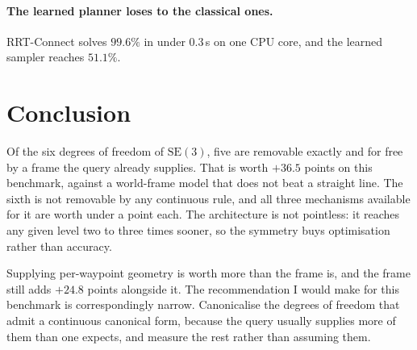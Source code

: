 \documentclass[11pt,a4paper]{article}
\newcommand{\SE}{\mathrm{SE}(3)}
\begin{document}
\paragraph{The learned planner loses to the classical ones.} RRT-Connect solves
$99.6\%$ in under $0.3$\,s on one CPU core, and the learned sampler reaches
$51.1\%$. 
\section{Conclusion}

Of the six degrees of freedom of $\SE$, five are removable exactly and for free
by a frame the query already supplies. That is worth $+36.5$ points on this
benchmark, against a world-frame model that does not beat a straight line. The
sixth is not removable by any continuous rule, and all three mechanisms available
for it are worth under a point each. The architecture is not pointless: it
reaches any given level two to three times sooner, so the symmetry buys
optimisation rather than accuracy.

Supplying per-waypoint geometry is worth more than the frame is, and the frame
still adds $+24.8$ points alongside it. The recommendation I would make for this
benchmark is correspondingly narrow. Canonicalise the degrees of freedom that
admit a continuous canonical form, because the query usually supplies more of
them than one expects, and measure the rest rather than assuming them.
\end{document}

